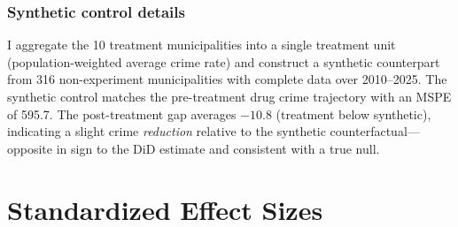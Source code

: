 \documentclass[12pt]{article}
\begin{document}
\subsubsection*{Synthetic control details} I aggregate the 10 treatment municipalities into a single treatment unit (population-weighted average crime rate) and construct a synthetic counterpart from 316 non-experiment municipalities with complete data over 2010--2025. The synthetic control matches the pre-treatment drug crime trajectory with an MSPE of 595.7. The post-treatment gap averages $-10.8$ (treatment below synthetic), indicating a slight crime \textit{reduction} relative to the synthetic counterfactual---opposite in sign to the DiD estimate and consistent with a true null.


\section{Standardized Effect Sizes}
\label{sec:sde}


\end{document}
